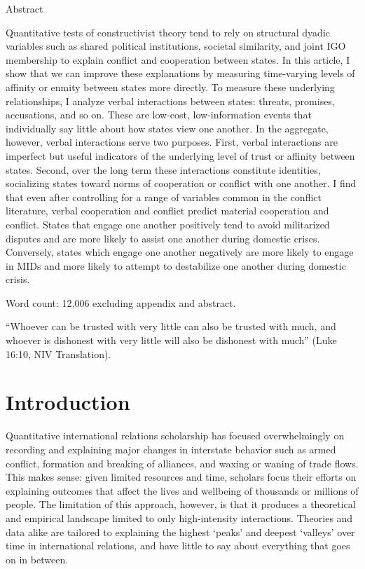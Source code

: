 \documentclass[10pt,]{article}
\let\stdsection\section
\renewcommand\section{\newpage\stdsection}
\begin{document}
\doublespacing


\begin{center}Abstract\end{center}

\noindent Quantitative tests of constructivist theory tend to rely on structural
dyadic variables such as shared political institutions, societal
similarity, and joint IGO membership to explain conflict and cooperation
between states. In this article, I show that we can improve these
explanations by measuring time-varying levels of affinity or enmity
between states more directly. To measure these underlying relationships,
I analyze verbal interactions between states: threats, promises,
accusations, and so on. These are low-cost, low-information events that
individually say little about how states view one another. In the
aggregate, however, verbal interactions serve two purposes. First,
verbal interactions are imperfect but useful indicators of the
underlying level of trust or affinity between states. Second, over the
long term these interactions constitute identities, socializing states
toward norms of cooperation or conflict with one another. I find that
even after controlling for a range of variables common in the conflict
literature, verbal cooperation and conflict predict material cooperation
and conflict. States that engage one another positively tend to avoid
militarized disputes and are more likely to assist one another during
domestic crises. Conversely, states which engage one another negatively
are more likely to engage in MIDs and more likely to attempt to
destabilize one another during domestic crisis.




\newpage

Word count: 12,006 excluding appendix and abstract.

``Whoever can be trusted with very little can also be trusted with much,
and whoever is dishonest with very little will also be dishonest with
much'' (Luke 16:10, NIV Translation).

\section{Introduction}\label{introduction}

Quantitative international relations scholarship has focused
overwhelmingly on recording and explaining major changes in interstate
behavior such as armed conflict, formation and breaking of alliances,
and waxing or waning of trade flows. This makes sense: given limited
resources and time, scholars focus their efforts on explaining outcomes
that affect the lives and wellbeing of thousands or millions of people.
The limitation of this approach, however, is that it produces a
theoretical and empirical landscape limited to only high-intensity
interactions. Theories and data alike are tailored to explaining the
highest `peaks' and deepest `valleys' over time in international
relations, and have little to say about everything that goes on in
between.
\end{document}

